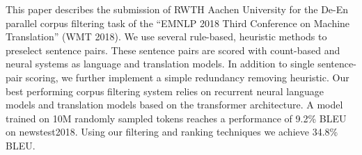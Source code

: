 This paper describes the submission of RWTH Aachen University for the De-En parallel corpus filtering task of the ``EMNLP 2018 Third Conference on Machine Translation'' (WMT 2018). We use several rule-based, heuristic methods to preselect sentence pairs. These sentence pairs are scored with count-based and neural systems as language and translation models. In addition to single sentence-pair scoring, we further implement a simple redundancy removing heuristic. Our best performing corpus filtering system relies on recurrent neural language models and translation models based on the transformer architecture. A model trained on 10M randomly sampled tokens reaches a performance of 9.2\% BLEU on newstest2018. Using our filtering and ranking techniques we achieve 34.8\% BLEU.
